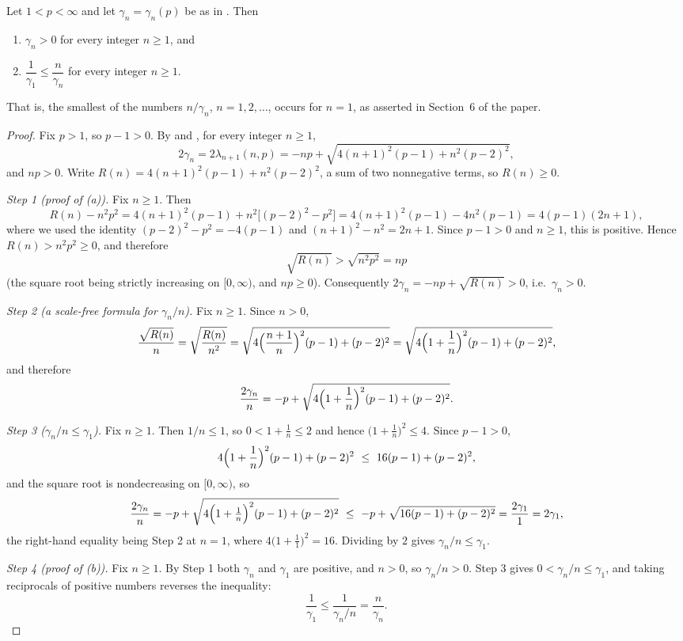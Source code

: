 \begin{lemma}
Let $1<p<\infty$ and let $\gamma_n=\gamma_n(p)$ be as in .
Then
\begin{enumerate}
\item[(a)] $\gamma_n>0$ for every integer $n\ge1$, and
\item[(b)] $\dfrac{1}{\gamma_1}\le\dfrac{n}{\gamma_n}$ for every integer
$n\ge1$.
\end{enumerate}
That is, the smallest of the numbers $n/\gamma_n$, $n=1,2,\dots$, occurs for
$n=1$, as asserted in Section~6 of the paper.
\end{lemma}
\begin{proof}
Fix $p>1$, so $p-1>0$.  By  and , for
every integer $n\ge1$,
\[
  2\gamma_n=2\lambda_{n+1}(n,p)=-np+\sqrt{4(n+1)^2(p-1)+n^2(p-2)^2},
\]
and $np>0$.  Write $R(n)=4(n+1)^2(p-1)+n^2(p-2)^2$, a sum of two nonnegative
terms, so $R(n)\ge0$.

\emph{Step 1 (proof of (a)).}  Fix $n\ge1$.  Then
\[
  R(n)-n^2p^2=4(n+1)^2(p-1)+n^2\bigl[(p-2)^2-p^2\bigr]
  =4(n+1)^2(p-1)-4n^2(p-1)=4(p-1)(2n+1),
\]
where we used the identity $(p-2)^2-p^2=-4(p-1)$ and
$(n+1)^2-n^2=2n+1$.  Since $p-1>0$ and $n\ge1$, this is positive.  Hence
$R(n)>n^2p^2\ge0$, and therefore
\[
  \sqrt{R(n)}>\sqrt{n^2p^2}=np
\]
(the square root being strictly increasing on $[0,\infty)$, and $np\ge0$).
Consequently $2\gamma_n=-np+\sqrt{R(n)}>0$, i.e.\ $\gamma_n>0$.

\emph{Step 2 (a scale-free formula for $\gamma_n/n$).}  Fix $n\ge1$.  Since
$n>0$,
\[
  \frac{\sqrt{R(n)}}{n}=\sqrt{\frac{R(n)}{n^2}}
  =\sqrt{4\Bigl(\frac{n+1}{n}\Bigr)^2(p-1)+(p-2)^2}
  =\sqrt{4\Bigl(1+\frac1n\Bigr)^2(p-1)+(p-2)^2},
\]
and therefore
\[
  \frac{2\gamma_n}{n}=-p+\sqrt{4\Bigl(1+\frac1n\Bigr)^2(p-1)+(p-2)^2}.
\]

\emph{Step 3 ($\gamma_n/n\le\gamma_1$).}  Fix $n\ge1$.  Then $1/n\le1$, so
$0<1+\frac1n\le2$ and hence $\bigl(1+\frac1n\bigr)^2\le4$.  Since $p-1>0$,
\[
  4\Bigl(1+\frac1n\Bigr)^2(p-1)+(p-2)^2\ \le\ 16(p-1)+(p-2)^2 ,
\]
and the square root is nondecreasing on $[0,\infty)$, so
\[
  \frac{2\gamma_n}{n}=-p+\sqrt{4\Bigl(1+\tfrac1n\Bigr)^2(p-1)+(p-2)^2}
  \ \le\ -p+\sqrt{16(p-1)+(p-2)^2}=\frac{2\gamma_1}{1}=2\gamma_1 ,
\]
the right-hand equality being Step 2 at $n=1$, where
$4\bigl(1+\frac11\bigr)^2=16$.  Dividing by $2$ gives
$\gamma_n/n\le\gamma_1$.

\emph{Step 4 (proof of (b)).}  Fix $n\ge1$.  By Step 1 both $\gamma_n$ and
$\gamma_1$ are positive, and $n>0$, so $\gamma_n/n>0$.  Step 3 gives
$0<\gamma_n/n\le\gamma_1$, and taking reciprocals of positive numbers reverses
the inequality:
\[
  \frac{1}{\gamma_1}\le\frac{1}{\gamma_n/n}=\frac{n}{\gamma_n}.
\]
\end{proof}
